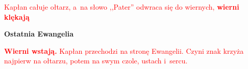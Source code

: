 \begin{center}
\textcolor{red}{Kapłan całuje ołtarz, a~na słowo ,,Pater'' odwraca się do wiernych, \textbf{wierni klękają}}
\end{center}

\begin{Parallel}[v]{0.485\textwidth}{0.485\textwidth}

\end{Parallel}

\begin{center}
\textbf{Ostatnia Ewangelia}
\end{center}

\begin{center}
\textcolor{red}{\textbf{Wierni wstają.} Kapłan przechodzi na stronę Ewangelii. Czyni znak krzyża najpierw na ołtarzu, potem na swym czole, ustach i~sercu.}
\end{center}

